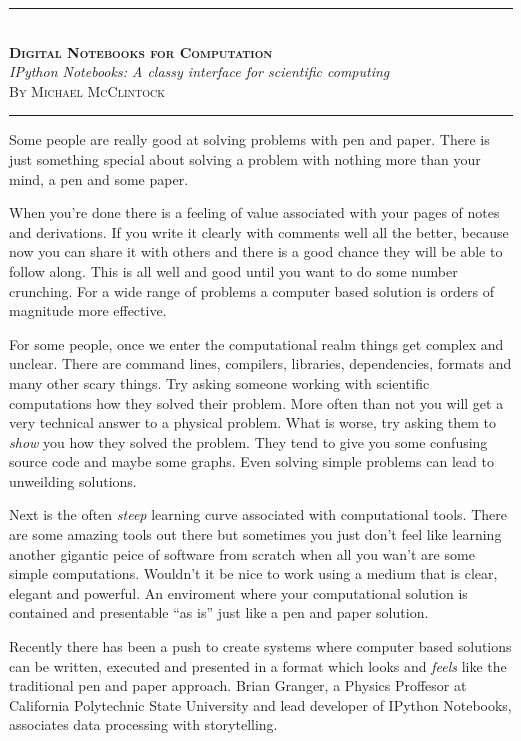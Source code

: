 \documentclass[11pt, a4paper]{article}  %
\begin{document}
\begin{center}
    \rule[0.5ex]{1\columnwidth}{1pt}
    \\[4mm]
    \textbf{\textsc{\Huge Digital Notebooks for Computation}}
    \\[6mm]
    \textit{\Large IPython Notebooks: A classy interface for scientific
    computing}
    \\[6mm]
    \textsc{\large By Michael McClintock}
    \\[4mm]
    \rule[0.5ex]{1\columnwidth}{1pt}
\end{center}

\begin{multicols}{2}

Some people are really good at solving problems with pen and paper. There is
just something special about solving a problem with nothing more than your
mind, a pen and some paper.

When you're done there is a feeling of value associated with your pages of
notes and derivations. If you write it clearly with comments well all the
better, because now you can share it with others and there is a good chance
they will be able to follow along. This is all well and good until you want to
do some number crunching. For a wide range of problems a computer based
solution is orders of magnitude more effective.

For some people, once we enter the computational realm things get complex and
unclear. There are command lines, compilers, libraries, dependencies, formats
and many other scary things. Try asking someone working with scientific
computations how they solved their problem. More often than not you will get a
very technical answer to a physical problem. What is worse, try asking them to
\emph{show} you how they solved the problem. They tend to give you some
confusing source code and maybe some graphs. Even solving simple problems can
lead to unweilding solutions.

Next is the often \emph{steep} learning curve associated with computational
tools. There are some amazing tools out there but sometimes you just don't
feel like learning another gigantic peice of software from scratch when all
you wan't are some simple computations. Wouldn't it be nice to work using a
medium that is clear, elegant and powerful. An enviroment where your
computational solution is contained and presentable ``as is'' just like a pen
and paper solution.

Recently there has been a push to create systems where computer based
solutions can be written, executed and presented in a format which looks and
\emph{feels} like the traditional pen and paper approach. Brian Granger, a
Physics Proffesor at California Polytechnic State University and lead
developer of IPython Notebooks, associates data processing with storytelling.
\cite{granger}


\end{multicols}
\end{document}
